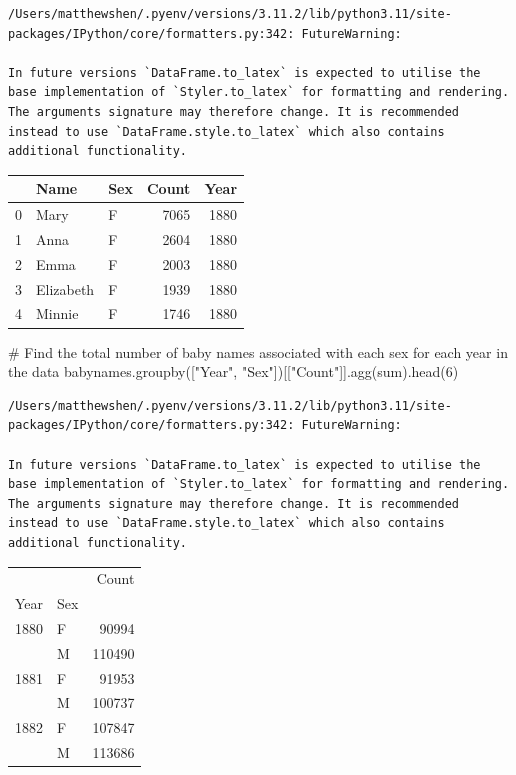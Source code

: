 \documentclass[
  letterpaper,
  DIV=11,
  numbers=noendperiod]{scrreprt}
\newenvironment{Shaded}{\begin{snugshade}}{\end{snugshade}}
\newcommand{\BuiltInTok}[1]{\textcolor[rgb]{0.00,0.23,0.31}{#1}}
\newcommand{\CommentTok}[1]{\textcolor[rgb]{0.37,0.37,0.37}{#1}}
\newcommand{\DecValTok}[1]{\textcolor[rgb]{0.68,0.00,0.00}{#1}}
\newcommand{\NormalTok}[1]{\textcolor[rgb]{0.00,0.23,0.31}{#1}}
\newcommand{\StringTok}[1]{\textcolor[rgb]{0.13,0.47,0.30}{#1}}
\begin{document}
\begin{verbatim}
/Users/matthewshen/.pyenv/versions/3.11.2/lib/python3.11/site-packages/IPython/core/formatters.py:342: FutureWarning:

In future versions `DataFrame.to_latex` is expected to utilise the base implementation of `Styler.to_latex` for formatting and rendering. The arguments signature may therefore change. It is recommended instead to use `DataFrame.style.to_latex` which also contains additional functionality.
\end{verbatim}

\begin{tabular}{lllrr}
\toprule
{} &       Name & Sex &  Count &  Year \\
\midrule
0 &       Mary &   F &   7065 &  1880 \\
1 &       Anna &   F &   2604 &  1880 \\
2 &       Emma &   F &   2003 &  1880 \\
3 &  Elizabeth &   F &   1939 &  1880 \\
4 &     Minnie &   F &   1746 &  1880 \\
\bottomrule
\end{tabular}

\begin{Shaded}
\begin{Highlighting}[]
\CommentTok{\# Find the total number of baby names associated with each sex for each year in the data}
\NormalTok{babynames.groupby([}\StringTok{"Year"}\NormalTok{, }\StringTok{"Sex"}\NormalTok{])[[}\StringTok{"Count"}\NormalTok{]].agg(}\BuiltInTok{sum}\NormalTok{).head(}\DecValTok{6}\NormalTok{)}
\end{Highlighting}
\end{Shaded}

\begin{verbatim}
/Users/matthewshen/.pyenv/versions/3.11.2/lib/python3.11/site-packages/IPython/core/formatters.py:342: FutureWarning:

In future versions `DataFrame.to_latex` is expected to utilise the base implementation of `Styler.to_latex` for formatting and rendering. The arguments signature may therefore change. It is recommended instead to use `DataFrame.style.to_latex` which also contains additional functionality.
\end{verbatim}

\begin{tabular}{llr}
\toprule
     &   &   Count \\
Year & Sex &         \\
\midrule
1880 & F &   90994 \\
     & M &  110490 \\
1881 & F &   91953 \\
     & M &  100737 \\
1882 & F &  107847 \\
     & M &  113686 \\
\bottomrule
\end{tabular}
\end{document}

